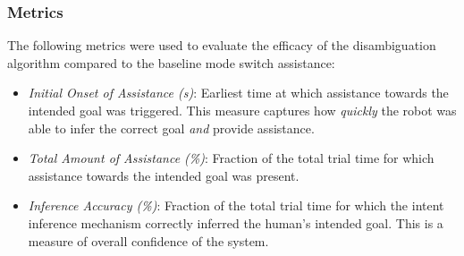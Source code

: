 \documentclass[conference]{IEEEtran}
\begin{document}
\subsubsection{Metrics}
The following metrics were used to evaluate the efficacy of the disambiguation algorithm compared to the baseline mode switch assistance:
\begin{itemize}
	\item \textit{Initial Onset of Assistance (s)}: Earliest time at which assistance towards the intended goal was triggered. This measure captures how \textit{quickly} the robot was able to infer the correct goal  \textit{and} provide assistance. 
	\item \textit{Total Amount of Assistance (\%)}: Fraction of the total trial time for which assistance towards the intended goal was present.  
	\item \textit{Inference Accuracy (\%)}: Fraction of the total trial time for which the intent inference mechanism correctly inferred the human's intended goal. This is a measure of overall confidence of the system. 
\end{itemize}
\end{document}
